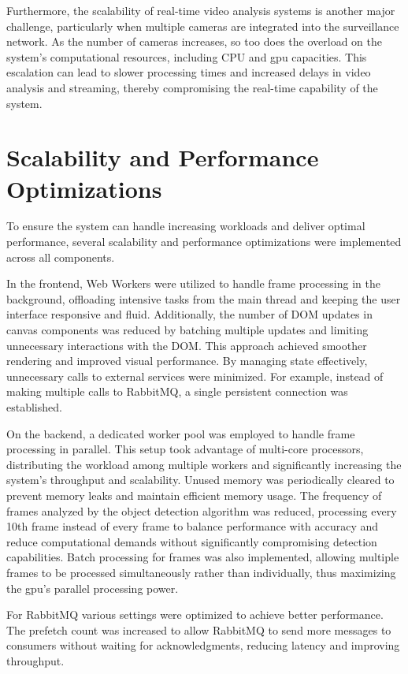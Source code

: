 Furthermore, the scalability of real-time video analysis systems is another major challenge, particularly when multiple 
cameras are integrated into the surveillance network. As the number of cameras increases, so too does the overload on the 
system's computational resources, including CPU and \ac{gpu} capacities. This escalation can lead to slower processing times 
and increased delays in video analysis and streaming, thereby compromising the real-time capability of the system.
\section{Scalability and Performance Optimizations}
To ensure the system can handle increasing workloads and deliver optimal performance, several 
scalability and performance optimizations were implemented across all components.

In the frontend, Web Workers were utilized to handle frame processing in the background, offloading intensive 
tasks from the main thread and keeping the user interface responsive and fluid.
Additionally, the number of DOM updates in canvas components was reduced by batching multiple updates and limiting 
unnecessary interactions with the DOM. This approach achieved smoother rendering and improved visual performance.
By managing state effectively, unnecessary calls to external services were minimized. For example, instead of making 
multiple calls to RabbitMQ, a single persistent connection was established.

On the backend, a dedicated worker pool was employed to handle frame processing in parallel. This setup took 
advantage of multi-core processors, distributing the workload among multiple workers and significantly increasing 
the system's throughput and scalability. Unused memory was periodically cleared to prevent memory leaks and maintain 
efficient memory usage.
The frequency of frames analyzed by the object detection algorithm was reduced, processing every 10th frame 
instead of every frame to balance performance with accuracy and reduce computational demands without significantly 
compromising detection capabilities.
Batch processing for frames was also implemented, allowing multiple frames to be processed simultaneously rather 
than individually, thus maximizing the \ac{gpu}'s parallel processing power.

For RabbitMQ various settings were optimized to achieve better performance. The prefetch count was increased to 
allow RabbitMQ to send more messages to consumers without waiting for acknowledgments, reducing latency and improving 
throughput.
